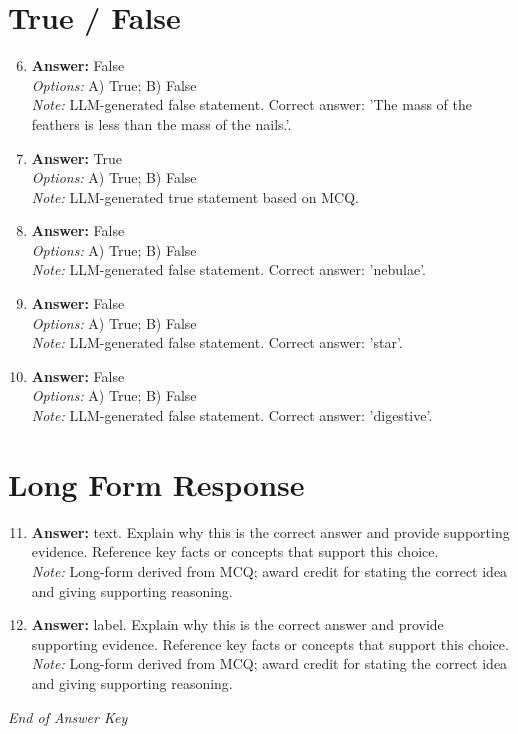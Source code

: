 \documentclass[12pt]{article}
\begin{document}
\section*{True / False}
\begin{enumerate}[label=\arabic*.]
\setcounter{enumi}{5}
\item \textbf{Answer:} False
\\ \textit{Options:} A) True; B) False
\\ \textit{Note:} LLM-generated false statement. Correct answer: 'The mass of the feathers is less than the mass of the nails.'.
\item \textbf{Answer:} True
\\ \textit{Options:} A) True; B) False
\\ \textit{Note:} LLM-generated true statement based on MCQ.
\item \textbf{Answer:} False
\\ \textit{Options:} A) True; B) False
\\ \textit{Note:} LLM-generated false statement. Correct answer: 'nebulae'.
\item \textbf{Answer:} False
\\ \textit{Options:} A) True; B) False
\\ \textit{Note:} LLM-generated false statement. Correct answer: 'star'.
\item \textbf{Answer:} False
\\ \textit{Options:} A) True; B) False
\\ \textit{Note:} LLM-generated false statement. Correct answer: 'digestive'.
\end{enumerate}

\section*{Long Form Response}
\begin{enumerate}[label=\arabic*.]
\setcounter{enumi}{10}
\item \textbf{Answer:} text. Explain why this is the correct answer and provide supporting evidence. Reference key facts or concepts that support this choice.
\\ \textit{Note:} Long-form derived from MCQ; award credit for stating the correct idea and giving supporting reasoning.
\item \textbf{Answer:} label. Explain why this is the correct answer and provide supporting evidence. Reference key facts or concepts that support this choice.
\\ \textit{Note:} Long-form derived from MCQ; award credit for stating the correct idea and giving supporting reasoning.
\end{enumerate}

\vfill
\noindent\textit{End of Answer Key}
\end{document}

